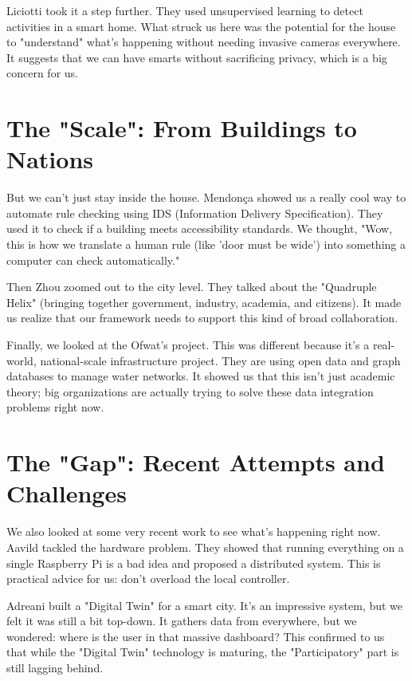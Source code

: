 \documentclass[a4paper,oneside,12pt]{report}
\begin{document}
Liciotti\cite{Liciotti2020} took it a step further. They used unsupervised learning to detect activities in a smart home. What struck us here was the potential for the house to "understand" what's happening without needing invasive cameras everywhere. It suggests that we can have smarts without sacrificing privacy, which is a big concern for us.

\section{The "Scale": From Buildings to Nations}
But we can't just stay inside the house. Mendonça\cite{Mendonca2024} showed us a really cool way to automate rule checking using IDS (Information Delivery Specification). They used it to check if a building meets accessibility standards. We thought, "Wow, this is how we translate a human rule (like 'door must be wide') into something a computer can check automatically."

Then Zhou\cite{Zhou2024} zoomed out to the city level. They talked about the "Quadruple Helix" (bringing together government, industry, academia, and citizens). It made us realize that our framework needs to support this kind of broad collaboration.

Finally, we looked at the Ofwat's\cite{ThamesWater2024} project. This was different because it's a real-world, national-scale infrastructure project. They are using open data and graph databases to manage water networks. It showed us that this isn't just academic theory; big organizations are actually trying to solve these data integration problems right now.

\section{The "Gap": Recent Attempts and Challenges}
We also looked at some very recent work to see what's happening right now. Aavild\cite{Aavild2024} tackled the hardware problem. They showed that running everything on a single Raspberry Pi is a bad idea and proposed a distributed system. This is practical advice for us: don't overload the local controller.

Adreani\cite{Adreani2024} built a "Digital Twin" for a smart city. It's an impressive system, but we felt it was still a bit top-down. It gathers data from everywhere, but we wondered: where is the user in that massive dashboard? This confirmed to us that while the "Digital Twin" technology is maturing, the "Participatory" part is still lagging behind.
\end{document}
